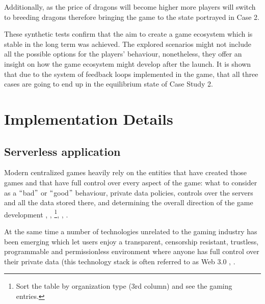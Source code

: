\documentclass[12pt]{article}
\begin{document}
Additionally, as the price of dragons will become higher more players will switch to breeding dragons therefore bringing the game to the state portrayed in Case 2.\par

These synthetic tests confirm that the aim to create a game ecosystem which is stable in the long term was achieved. The explored scenarios might not include all the possible options for the players’ behaviour, nonetheless, they offer an insight on how the game ecosystem might develop after the launch. It is shown that due to the system of feedback loops implemented in the game, that all three cases are going to end up in the equilibrium state of Case Study 2.\par


\newpage

\vspace{\baselineskip}\section{Implementation Details}
\label{Implementation Details}  \par

\subsection{Serverless application}
\label{Serverless application} \par

Modern centralized games heavily rely on the entities that have created those games and that have full control over every aspect of the game: what to consider as a $``$bad$"$  or $``$good$"$  behaviour, private data policies, controls over the servers and all the data stored there, and determining the overall direction of the game development  \cite{Gogo_2018_Jun_16},  \cite{Steam_2017},  \cite{WikipediA_2018}\footnote{Sort the table by organization type (3rd column) and see the gaming entries.}, \cite{Ben_Gilbert_2018_Jun_22},  \cite{Aaron_Mamiit__2017_Mar_30}.\par

At the same time a number of technologies unrelated to the gaming industry has been emerging which let users enjoy a transparent, censorship resistant, trustless, programmable and permissionless environment where anyone has full control over their private data (this technology stack is often referred to as Web 3.0  \cite{Josh_Stark_2018_Jun_6},  \cite{Stephan_Tual_2017_May_26}.\par
\end{document}
